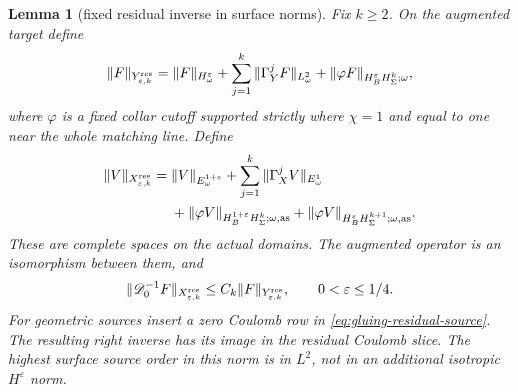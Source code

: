 \documentclass[11pt]{amsart}
\newtheorem{lemma}[theorem]{Lemma}
\theoremstyle{definition}
\theoremstyle{remark}
\theoremstyle{plain}
\begin{document}
\begin{lemma}[fixed residual inverse in surface norms]
\label{lem:gluing-fixed-residual-inverse}
Fix $k\geq2$. On the augmented target define
\begin{equation}\label{eq:gluing-residual-source}
 \|F\|_{Y^{\rm res}_{\varepsilon,k}}
 =\|F\|_{H^\varepsilon_\omega}
  +\sum_{j=1}^k\|\Gamma_Y^jF\|_{L^2_\omega}
  +\|\varphi F\|_{H_B^\varepsilon H^k_\Sigma;\omega},
\end{equation}
where $\varphi$ is a fixed collar cutoff supported strictly where
$\chi=1$ and equal to one near the whole matching line. Define
\begin{equation}\label{eq:gluing-residual-domain}
 \begin{split}
 \|V\|_{X^{\rm res}_{\varepsilon,k}}={}&
 \|V\|_{E^{1+\varepsilon}_\omega}
 +\sum_{j=1}^k\|\Gamma_X^jV\|_{E^1_\omega}\\
 &+\|\varphi V\|_{H_B^{1+\varepsilon}H^k_\Sigma;\omega,{\rm as}}
 +\|\varphi V\|_{H_B^\varepsilon H^{k+1}_\Sigma;\omega,{\rm as}}.
 \end{split}
\end{equation}
These are complete spaces on the actual domains. The augmented
operator is an isomorphism between them, and
\begin{equation}\label{eq:gluing-fixed-residual-bound}
 \|\mathscr D_0^{-1}F\|_{X^{\rm res}_{\varepsilon,k}}
             \leq C_k\|F\|_{Y^{\rm res}_{\varepsilon,k}},
                    \qquad 0<\varepsilon\leq1/4.
\end{equation}
For geometric sources insert a zero Coulomb row in
\eqref{eq:gluing-residual-source}. The resulting right inverse has
its image in the residual Coulomb slice. The highest surface source
order in this norm is in $L^2$, not in an additional isotropic
$H^\varepsilon$ norm.
\end{lemma}
\end{document}
